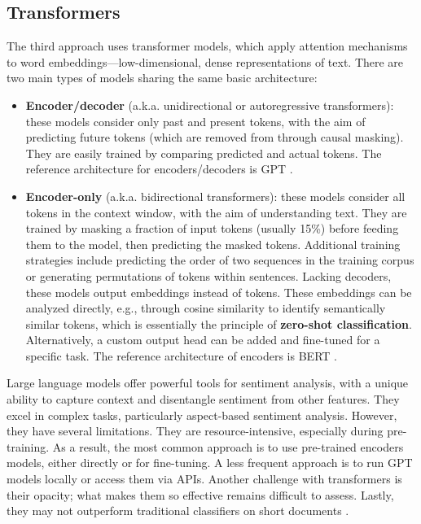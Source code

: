 \documentclass{article}
\begin{document}
\subsection{Transformers}

The third approach uses transformer models, which apply attention mechanisms to word embeddings—low-dimensional, dense representations of text. There are two main types of models sharing the same basic architecture:
\begin{itemize}
    \item \textbf{Encoder/decoder} (a.k.a. unidirectional or autoregressive transformers): these models consider only past and present tokens, with the aim of predicting future tokens (which are removed from through causal masking). They are easily trained by comparing predicted and actual tokens. The reference architecture for encoders/decoders is GPT \citep{radford_improving_2018,radford_language_2019}.
    \item \textbf{Encoder-only} (a.k.a. bidirectional transformers): these models consider all tokens in the context window, with the aim of understanding text. They are trained by masking a fraction of input tokens (usually 15\%) before feeding them to the model, then predicting the masked tokens. Additional training strategies include predicting the order of two sequences in the training corpus or generating permutations of tokens within sentences. Lacking decoders, these models output embeddings instead of tokens. These embeddings can be analyzed directly, e.g., through cosine similarity to identify semantically similar tokens, which is essentially the principle of \textbf{zero-shot classification}. Alternatively, a custom output head can be added and fine-tuned for a specific task. The reference architecture of encoders is BERT \citep{devlin_bert_2019}.
\end{itemize}

Large language models offer powerful tools for sentiment analysis, with a unique ability to capture context and disentangle sentiment from other features. They excel in complex tasks, particularly aspect-based sentiment analysis. However, they have several limitations. They are resource-intensive, especially during pre-training. As a result, the most common approach is to use pre-trained encoders models, either directly or for fine-tuning. A less frequent approach is to run GPT models locally or access them via APIs. Another challenge with transformers is their opacity; what makes them so effective remains difficult to assess. Lastly, they may not outperform traditional classifiers on short documents \citep{ghatora_sentiment_2024}.
\end{document}
